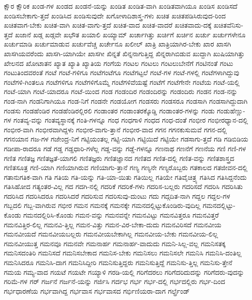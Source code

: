 {ಕ್ಷೌರ
ಕ್ಷೌರಿಕ
ಖಂಡ-ಗಳ
ಖಂಡದ
ಖಂಡನೆ-ಯನ್ನು
ಖಂಡಿತ
ಖಂಡಿತ-ವಾಗಿ
ಖಂಡಿತವಾಗಿಯೂ
ಖಂಡಿಸ
ಖಂಡಿಸದೆ
ಖಂಡಿಸಬೇಕಾಗು-ತ್ತದೆ
ಖಂಡಿಸಿದ
ಖಂಡಿಸುವುದೇ
ಖಗೋಳಾದಿಶಾಸ್ತ್ರ-ಗಳು
ಖಚಿತ
ಖಚಿತಪಡಿಸಿರುವುದ-ರಿಂದ
ಖಚಿತವಾಗ-ಬೇಕು
ಖಚಿತ-ವಾಗಿ
ಖಚಿತ-ವಾಗು-ತ್ತದೆ
ಖಚಿತ-ವಾದ
ಖಚಿತ-ವಾದರೆ
ಖಚಿತವಾದು-ದಕ್ಕೆ
ಖಚಿತವೆನಿಸು-ತ್ತದೆ
ಖಜಾನೆ
ಖಡ್ಗ
ಖಡ್ಗವೇ
ಖಭೌತ
ಖಯಾಲಿ
ಖಯ್ಯಾಮ್
ಖರ್ಚಾಗಿತ್ತು
ಖರ್ಚಿಗೆ
ಖರ್ಚಿನ
ಖರ್ಚು
ಖರ್ಚುಗಳೇನೂ
ಖರ್ಚುಮಾಡಿ
ಖರ್ಚುಮಾಡುವ
ಖರ್ಚುವೆಚ್ಚ
ಖರ್ಚೇನೂ
ಖಲೀಲ್
ಖಾತ್ರಿ
ಖಾತ್ರಿಯಾಗಿರ-ಬೇಕು
ಖಾರ
ಖಾಸಗಿ
ಖಾಸಗಿಯವರೆಂದು
ಖಾಸಗಿ-ಯಾಗಿಯೇ
ಖಾಸಗೀ
ಖಿನ್ನತೆ
ಖಿನ್ನನಾಗುತ್ತಿದ್ದ
ಖಿನ್ನರಾಗಿಬಿಡುವ
ಖುದ್ದಾಗಿ
ಖುಷಿಯಾಗಿತ್ತು
ಖೇಲನದ
ಖೋಟಾತನ
ಖ್ಯಾತ
ಖ್ಯಾತಿ
ಖ್ಯಾತಿಯ
ಗಂಗೆಯ
ಗಂಟಲ
ಗಂಟಲು
ಗಂಟಲುಬೇನೆಗೆ
ಗಂಟಿನಂತೆ
ಗಂಟು
ಗಂಟುತಿಂದವರಂತೆ
ಗಂಟೆ
ಗಂಟೆ-ಗಳಿಗೂ
ಗಂಟೆಗಂಟೆಗೂ
ಗಂಟೆಗಟ್ಟಲೆ
ಗಂಟೆ-ಗಳ
ಗಂಟೆ-ಗಳಲ್ಲಿ
ಗಂಟೆಗಳಾಗಿದ್ದುವು
ಗಂಟೆಗಳಿ-ಗಿಂತಲೂ
ಗಂಟೆಗಳಿಗೂ
ಗಂಟೆಗಳಿಗೊಮ್ಮೆ
ಗಂಟೆಗಳಿವೆಯಷ್ಟೆ
ಗಂಟೆಗೆ
ಗಂಟೆಗೇನೇ
ಗಂಟೆಯ
ಗಂಟೆ-ಯಲ್ಲಿ
ಗಂಟೆ-ಯಾಗಿ
ಗಂಟೆ-ಯಾದರೂ
ಗಂಟೆ-ಯಿಂದ
ಗಂಡ
ಗಂಡಂದಿರ
ಗಂಡಂದಿರನ್ನು
ಗಂಡಂದಿರು
ಗಂಡನ
ಗಂಡ-ನನ್ನು
ಗಂಡ-ನಾಗಿ
ಗಂಡನಿಗಾಗಿಯೂ
ಗಂಡ-ನಿಗೆ
ಗಂಡನೇ
ಗಂಡಯೋಗ
ಗಂಡಸರು
ಗಂಡಸರೂ
ಗಂಡಸಾಗಿ
ಗಂಡಸಾಗಿದ್ದುದಾಗಿ
ಗಂಡಸು
ಗಂಡಹೆಂಡಿರ
ಗಂಡಹೆಂಡಿರಲ್ಲಿರಲಿ
ಗಂಡಾಂತರ
ಗಂಡಾಂತರಕ್ಕೊಡ್ಡಿ
ಗಂಡಾಂತರ-ಗಳನ್ನು
ಗಂಡು
ಗಂಡುಹೆಣ್ಣು-ಗಳ
ಗಂತವ್ಯ-ವನ್ನು
ಗಂತವ್ಯಸ್ಥಾನಕ್ಕೆ
ಗಂತಿ-ಗಳನ್ನೂ
ಗಂಧ
ಗಂಧಗಾಳಿ
ಗಂಧದ
ಗಂಧ-ದಂತೆ
ಗಂಭೀರ
ಗಂಭೀರಧ್ಯಾನ-ದಲ್ಲಿ
ಗಂಭೀರ-ವಾಗಿ
ಗಂಭೀರವಾಗಿದ್ದಳು
ಗಂಭೀರ-ವಾಗು-ತ್ತಾನೆ
ಗಂಭೀರ-ವಾದ
ಗಗನ
ಗಗನಕುಸುಮವೆ
ಗಗನ-ದಲ್ಲಿ
ಗಗನಯಾನ
ಗಜ-ಗಳ
ಗಜೇಂದ್ರ-ನಿಗೆ
ಗಟ್ಟಿಯಂತಲ್ಲ
ಗಟ್ಟಿ-ಯಾಗಿ
ಗಟ್ಟಿಯಿದೆ
ಗಟ್ಟಿಯೇ
ಗಡಸಾಗು-ತ್ತದೆ
ಗಡಿ
ಗಡಿಬಿಡಿಯ
ಗಡೀಪಾ-ರಾದರೂ
ಗಡೆ
ಗಡ್ಡ
ಗಡ್ಡಧಾರಿ-ಗಳೆಲ್ಲ
ಗಡ್ಡ-ವನ್ನು
ಗಡ್ಡೆ-ಗಳನ್ನೂ
ಗಣನಾಥ
ಗಣನೆಗೆ
ಗಣನೆಯ
ಗಣಿ
ಗಣಿ-ಗಳ
ಗಣಿತ
ಗಣಿತಜ್ಞ
ಗಣಿತಜ್ಞತೆ-ಯಾಗಲಿ
ಗಣಿತಜ್ಞರು
ಗಣಿತಜ್ಞಾನದ
ಗಣಿತದ
ಗಣಿತ-ದಲ್ಲಿ
ಗಣಿತ-ವನ್ನು
ಗಣಿತಶಾಸ್ತ್ರದ
ಗಣಿತಸೂತ್ರ
ಗಣಿ-ಯಾಗಿ
ಗಣಿಯಾಗಿರುವ
ಗಣಿಯಾಗು-ತ್ತಾನೆ
ಗಣ್ಯ
ಗಣ್ಯನೇ
ಗಣ್ಯರೊಬ್ಬರು
ಗತಕಾಲದ
ಗತಜೀವನ-ದಲ್ಲಿ
ಗತಾನುಗತಿಕ-ವಾಗಿ
ಗತಿ
ಗತಿಯ
ಗತಿ-ಯನ್ನು
ಗತಿ-ಯಾ-ಯಿತು
ಗತಿಯಿಲ್ಲ
ಗತಿಯೇ
ಗತಿವೈಚಿತ್ರ್ಯ
ಗತಿಸಿದ
ಗತಿಸಿದ್ದನೆಂದು
ಗತಿಸಿಹೋದ
ಗತ್ಯಂತರ-ವಿಲ್ಲ
ಗದ
ಗದಗಿ-ನಲ್ಲಿ
ಗದರಿಕೆ
ಗದರಿಕೆ-ಗಳು
ಗದರಿಸ-ಬಲ್ಲರು
ಗದರಿಸದೆ
ಗದರಿಸಿ
ಗದರಿಸಿತು
ಗದರಿಸಿದ
ಗದರಿಸಿದರೂ
ಗದರಿಸಿದರೆ
ಗದರಿಸುವ
ಗದರಿಸುವು-ದುಂಟು
ಗದು
ಗದ್ಗದಿತ-ನಾಗಿ
ಗದ್ದಲ
ಗದ್ದಲ-ಗಳ
ಗಬ್ಬದಲಿ
ಗಬ್ಬ-ವಾಗಿರುವ
ಗಭೀರ
ಗಮನ
ಗಮನಕ್ಕೆ
ಗಮನಕ್ಕೇ
ಗಮನದಲ್ಲಿಟ್ಟುಕೊಂಡಿರು-ವುದಿಲ್ಲ
ಗಮನದಲ್ಲಿಟ್ಟು-ಕೊಂಡು
ಗಮನದಲ್ಲಿರಿಸಿ-ಕೊಂಡು
ಗಮನ-ವನ್ನು
ಗಮನವನ್ನೇ
ಗಮನವಿಟ್ಟು
ಗಮನವಿತ್ತರೂ
ಗಮನವಿತ್ತರೆ
ಗಮನವಿತ್ತಿರ-ಲಿಲ್ಲ
ಗಮನವಿ-ತ್ತಿಲ್ಲ
ಗಮನ-ವಿತ್ತು
ಗಮನ-ವಿರ-ಬೇಕಾ-ದುದು
ಗಮನವಿರಿಸದೆ
ಗಮನವೀಯ
ಗಮನವೀಯದೆ
ಗಮನವೀಯಬಲ್ಲರು
ಗಮನವೀಯಬೇಕಾಗಿಲ್ಲ
ಗಮನವೀಯ-ಬೇಕು
ಗಮನವೀಯ-ಲಿಲ್ಲ
ಗಮನವೀಯುತ್ತ
ಗಮನವೂ
ಗಮನವೇ
ಗಮನಾರ್ಹ
ಗಮನಾರ್ಹ-ವಾದುದು
ಗಮನಿ-ಸಿಲ್ಲ-ವಲ್ಲ
ಗಮನಿಸತಕ್ಕ
ಗಮನಿಸದಂತಿರಿ
ಗಮನಿಸದೆ
ಗಮನಿಸಬೇಕಾದ
ಗಮನಿಸ-ಬೇಕು
ಗಮನಿಸಲು
ಗಮನಿಸಲೇ
ಗಮನಿಸಿ
ಗಮನಿಸಿ-ದಂತಿಲ್ಲ
ಗಮನಿಸಿದರೂ
ಗಮನಿಸಿ-ದಾಗ
ಗಮನಿಸಿದ್ದೀರಿ
ಗಮನಿಸುತ್ತಿದ್ದರು
ಗಮನಿಸುತ್ತಿದ್ದೆ
ಗಮನಿಸು-ತ್ತಿಲ್ಲ
ಗಮನಿಸು-ತ್ತೇನೆ
ಗಮಯ
ಗಮ್ಯ-ವಾದ
ಗಯಟೆ
ಗಯಟೇ
ಗಯ್ಯಾಳಿ
ಗರಡಿ-ಯಲ್ಲಿ
ಗರಿಗೆದರಲು
ಗರಿಗೆದರಿದುದನ್ನು
ಗರಿಗೆದರು-ವುದನ್ನು
ಗರಿಮೆ-ಗಳ
ಗರ್
ಗರ್ಜನೆ
ಗರ್ಜನೆ-ಯನ್ನು
ಗರ್ಜಿಸಿ
ಗರ್ದಭ
ಗರ್ಭ
ಗರ್ಭ-ದಲ್ಲಿ
ಗರ್ಭದಲ್ಲಿರು
ಗರ್ಭ-ದಿಂದ
ಗರ್ಭಧಾರಣೆಯ
ಗರ್ಭವಾಗಿದ್ದ
ಗರ್ಭವಾಸ
ಗರ್ಭವಾಸದ
ಗರ್ಭಿಣಿಯರಾ-ದಾಗ
ಗರ್ಲ್ಫ್ರೆಂಡ್
}
